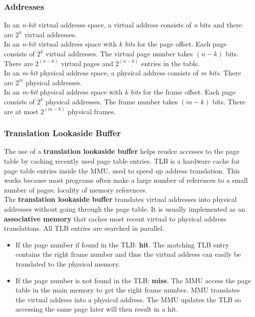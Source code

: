 \documentclass{article}
\newcommand{\bold}[1]{\textbf{#1}}
\renewcommand{\b}{\item[$\circ$]}
\newcommand{\newlist}{\begin{itemize}}
\renewcommand{\endlist}{\end{itemize}}
\begin{document}
\subsubsection{Addresses}

In an \emph{n-bit} virtual addresss space, a virtual address consists of \emph{n} bits and there are $2^n$ virtual addresses. \\ 

In an \emph{n-bit} virtual address space with \emph{k bits} for the page offset. Each page consists of $2^k$ virtual addresses. The virtual page number takes $(n-k)$ bits. There are $2^{(n-k)}$ virtual pages and $2^{(n-k)}$ entries in the table. \\ 

In an \emph{m-bit} physical address space, a physical address consists of \emph{m bits}. There are $2^m$ physical addresses. \\ 

In an \emph{m-bit} physical address space with \emph{k bits} for the frame offset. Each page consists of $2^k$ physical addresses. The frame number takes $(m-k)$ bits. There are at most $2^{(m-k)}$ physical frames. \\ 

\subsubsection{Translation Lookaside Buffer}

The use of a \bold{translation lookaside buffer} helps reudce accesses to the page table by caching recently used page table entries. TLB is a hardware cache for page table entries inside the MMU, used to speed up address translation. This works because most programs often make a large number of references to a small number of pages: locality of memory references. \\ 

The \bold{translation lookaside buffer} translates virtual addresses into physical addresses without going through the page table. It is usually implemented as an \bold{associative memory} that caches most recent virtual to physical address translations. All TLB entries are searched in parallel. 

\newlist 
\b If the page number if found in the TLB: \bold{hit}. The matching TLB entry contains the right frame number and thus the virtual address can easily be translated to the physical memory. 
\b If the page number is not found in the TLB: \bold{miss}. The MMU access the page table in the main memory to get the right frame number. MMU translates the virtual address into a physical address. The MMU updates the TLB so accessing the same page later will then result in a hit. 
\endlist
\end{document}

